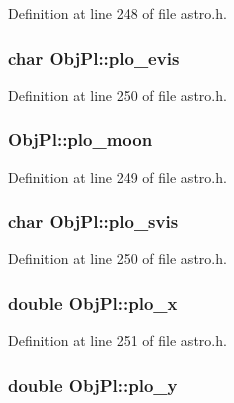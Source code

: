Definition at line 248 of file astro.\-h.

\hypertarget{struct_obj_pl_abaec487e4acac909942b434c8236c0c9}{
\subsubsection[{plo\-\_\-evis}]{\setlength{\rightskip}{0pt plus 5cm}char Obj\-Pl\-::plo\-\_\-evis}}\label{struct_obj_pl_abaec487e4acac909942b434c8236c0c9}


Definition at line 250 of file astro.\-h.

\hypertarget{struct_obj_pl_ae1eeda4bb29ca8b3a07fdc90900a01f7}{
\subsubsection[{plo\-\_\-moon}]{ Obj\-Pl\-::plo\-\_\-moon}}\label{struct_obj_pl_ae1eeda4bb29ca8b3a07fdc90900a01f7}


Definition at line 249 of file astro.\-h.

\hypertarget{struct_obj_pl_a77100a6431b4b0ca583835503381d92c}{
\subsubsection[{plo\-\_\-svis}]{\setlength{\rightskip}{0pt plus 5cm}char Obj\-Pl\-::plo\-\_\-svis}}\label{struct_obj_pl_a77100a6431b4b0ca583835503381d92c}


Definition at line 250 of file astro.\-h.

\hypertarget{struct_obj_pl_a78fcdddb0a9533018c4dad44ad6f85c7}{
\subsubsection[{plo\-\_\-x}]{\setlength{\rightskip}{0pt plus 5cm}double Obj\-Pl\-::plo\-\_\-x}}\label{struct_obj_pl_a78fcdddb0a9533018c4dad44ad6f85c7}


Definition at line 251 of file astro.\-h.

\hypertarget{struct_obj_pl_a8fc64c88e1982858a9537489b405d73a}{
\subsubsection[{plo\-\_\-y}]{\setlength{\rightskip}{0pt plus 5cm}double Obj\-Pl\-::plo\-\_\-y}}\label{struct_obj_pl_a8fc64c88e1982858a9537489b405d73a}


